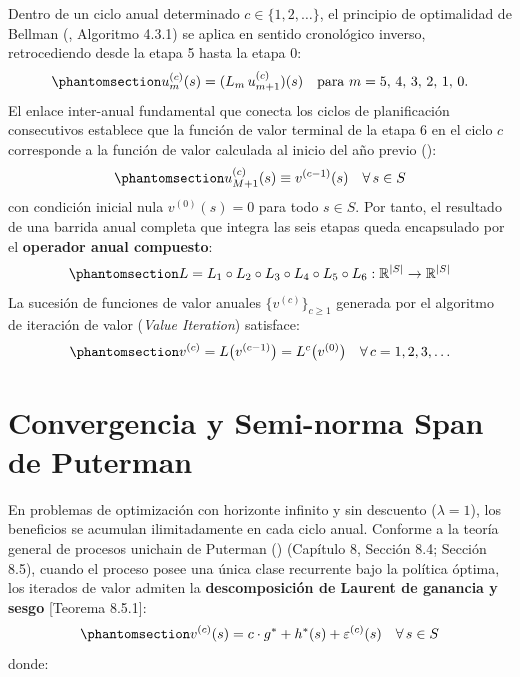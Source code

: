 \documentclass[
  spanish,
  letterpaper,
]{scrreprt}
\theoremstyle{definition}
\theoremstyle{remark}
\begin{document}
Dentro de un ciclo anual determinado \(c \in \{1, 2, \ldots\}\), el
principio de optimalidad de Bellman
(, Algoritmo 4.3.1) se
aplica en sentido cronológico inverso, retrocediendo desde la etapa 5
hasta la etapa 0:
\begin{equation}\protect\phantomsection\label{eq-recorrido-etapas}{
u_m^{(c)}(s) = (L_m\, u_{m+1}^{(c)})(s) \quad \text{para } m = 5,\, 4,\, 3,\, 2,\, 1, \, 0.
}\end{equation} El enlace inter-anual fundamental que conecta los ciclos
de planificación consecutivos establece que la función de valor terminal
de la etapa 6 en el ciclo \(c\) corresponde a la función de valor
calculada al inicio del año previo (): \begin{equation}\protect\phantomsection\label{eq-enlace-ciclos}{
u_{M+1}^{(c)}(s) \equiv v^{(c-1)}(s) \quad \forall\, s \in S
}\end{equation} con condición inicial nula \(v^{(0)}(s) = 0\) para todo
\(s \in S\). Por tanto, el resultado de una barrida anual completa que
integra las seis etapas queda encapsulado por el \textbf{operador anual
compuesto}:
\begin{equation}\protect\phantomsection\label{eq-operador-anual-compuesto}{
L = L_1 \circ L_2 \circ L_3 \circ L_4 \circ L_5 \circ L_6 : \mathbb{R}^{|S|} \to \mathbb{R}^{|S|}
}\end{equation} La sucesión de funciones de valor anuales
\(\{v^{(c)}\}_{c \ge 1}\) generada por el algoritmo de iteración de
valor (\emph{Value Iteration}) satisface:
\begin{equation}\protect\phantomsection\label{eq-iteracion-valor-anual}{
v^{(c)} = L\bigl(v^{(c-1)}\bigr) = L^c\bigl(v^{(0)}\bigr) \quad \forall\, c = 1, 2, 3, \ldots
}\end{equation}

\section{Convergencia y Semi-norma Span de
Puterman}\label{sec-convergencia}

En problemas de optimización con horizonte infinito y sin descuento
(\(\lambda = 1\)), los beneficios se acumulan ilimitadamente en cada
ciclo anual. Conforme a la teoría general de procesos unichain de
Puterman () (Capítulo 8, Sección
8.4; Sección 8.5), cuando el proceso posee una única clase recurrente
bajo la política óptima, los iterados de valor admiten la
\textbf{descomposición de Laurent de ganancia y sesgo} {[}Teorema
8.5.1{]}:
\begin{equation}\protect\phantomsection\label{eq-descomposicion-laurent}{
v^{(c)}(s) = c \cdot g^* + h^*(s) + \varepsilon^{(c)}(s) \quad \forall\, s \in S
}\end{equation} donde:
\end{document}
